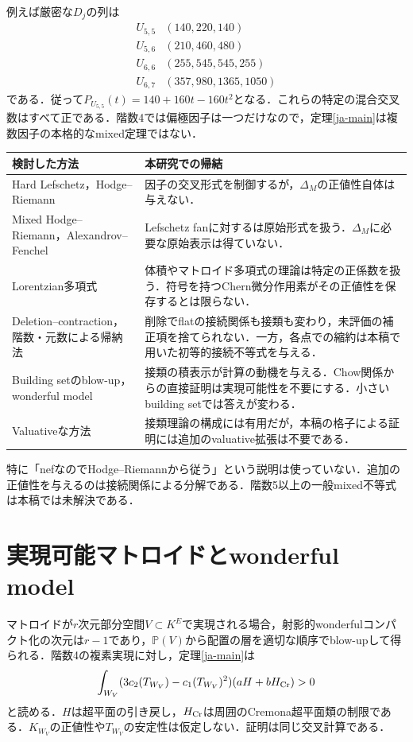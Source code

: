 \documentclass[12pt]{amsart}
\theoremstyle{definition}
\theoremstyle{remark}
\numberwithin{equation}{section}
\begin{document}
例えば厳密な$D_j$の列は
\[
\begin{array}{c|l}
U_{5,5}&(140,220,140)\\
U_{5,6}&(210,460,480)\\
U_{6,6}&(255,545,545,255)\\
U_{6,7}&(357,980,1365,1050)
\end{array}
\]
である．従って$P_{U_{5,5}}(t)=140+160t-160t^2$となる．これらの特定の混合交叉数はすべて正である．階数4では偏極因子は一つだけなので，定理\ref{ja-main}は複数因子の本格的なmixed定理ではない．

\begin{center}\small
\begin{tabularx}{\textwidth}{@{}p{3.6cm}X@{}}
\toprule
検討した方法&本研究での帰結\\\midrule
Hard Lefschetz，Hodge--Riemann&因子の交叉形式を制御するが，$\Delta_M$の正値性自体は与えない．\\
Mixed Hodge--Riemann，Alexandrov--Fenchel&Lefschetz fanに対する\cite[Theorem 5.20]{ADH}は原始形式を扱う．$\Delta_M$に必要な原始表示は得ていない．\\
Lorentzian多項式&体積やマトロイド多項式の理論\cite{BH}は特定の正係数を扱う．符号を持つChern微分作用素がその正値性を保存するとは限らない．\\
Deletion--contraction，階数・元数による帰納法&削除でflatの接続関係も接類も変わり，未評価の補正項を捨てられない．一方，各点での縮約は本稿で用いた初等的接続不等式を与える．\\
Building setのblow-up，wonderful model&接類の積表示が計算の動機を与える．Chow関係からの直接証明は実現可能性を不要にする．小さいbuilding setでは答えが変わる．\\
Valuativeな方法&接類理論の構成には有用だが，本稿の格子による証明には追加のvaluative拡張は不要である．\\
\bottomrule
\end{tabularx}
\end{center}
特に「nefなのでHodge--Riemannから従う」という説明は使っていない．追加の正値性を与えるのは接続関係による分解である．階数5以上の一般mixed不等式は本稿では未解決である．

\section{実現可能マトロイドとwonderful model}
マトロイドが$r$次元部分空間$V\subset K^E$で実現される場合，射影的wonderfulコンパクト化の次元は$r-1$であり，$\mathbb P(V)$から配置の層を適切な順序でblow-upして得られる\cite{DCP,CheG}．階数4の複素実現に対し，定理\ref{ja-main}は
\[
 \int_{W_V}(3c_2(T_{W_V})-c_1(T_{W_V})^2)(aH+bH_{\rm Cr})>0
\]
と読める．$H$は超平面の引き戻し，$H_{\rm Cr}$は周囲のCremona超平面類の制限である．$K_{W_V}$の正値性や$T_{W_V}$の安定性は仮定しない．証明は同じ交叉計算である．
\end{document}
